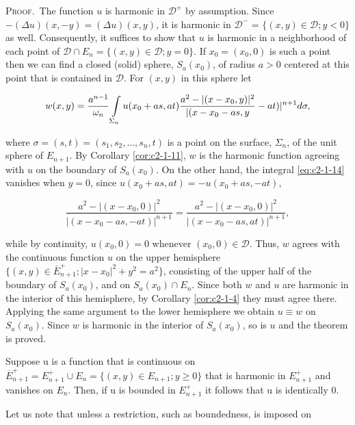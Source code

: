 \textsc{Proof.}\ The function $u$ is harmonic in $\mathcal{D}^+$ by assumption. Since $-(\Delta u)(x, -y) = (\Delta u)(x, y)$, it is harmonic in $\mathcal{D}^-$ = $\{(x, y) \in \mathcal{D}; y < 0\}$ as well. Consequently, it suffices to show that $u$ is harmonic in a neighborhood of each point of $\mathcal{D} \cap E_n = \{(x, y) \in \mathcal{D}; y = 0\}$. If $x_0 = (x_0, 0)$ is such a point then we can find a closed (solid) sphere, $S_a(x_0)$, of radius $a > 0$ centered at this point that is contained in $\mathcal{D}$. For $(x, y)$ in this sphere let

\begin{equation}\label{eq:c2-1-14}
w(x,y)=\frac{a^{n-1}}{\omega_{n}}\intop_{\Sigma_{n}}u(x_{0}+a s,a t)\frac{a^{2}-|(x-x_{0},y)|^{2}}{|(x-x_{0}-a s,y}-a t)|^{n+1}d\sigma,
\end{equation}

where $\sigma = (s, t) = (s_1, s_2, \ldots, s_n, t)$ is a point on the surface, $\Sigma_n$, of the unit sphere of $E_{n+1}$. By Corollary \ref{cor:c2-1-11}, $w$ is the harmonic function agreeing with $u$ on the boundary of $S_a(x_0)$. On the other hand, the integral \eqref{eq:c2-1-14} vanishes when $y = 0$, since $u(x_0 + as, at) = -u(x_0 + as, -at)$,

\[
\frac{a^{2}-|(x-x_{0},0)|^{2}}{|(x-x_{0}-as,-at)|^{n+1}}=\frac{a^{2}-|(x-x_{0},0)|^{2}}{|(x-x_{0}-as,at)|^{n+1}},
\]

while by continuity, $u(x_0,0)=0$ whenever $(x_0,0)\in\mathcal{D}$. Thus, $w$ agrees with the continuous function $u$ on the upper hemisphere $\{(x,y)\in\bar{E}_{n+1}^+ ; |x-x_0|^2+y^2=a^2\}$, consisting of the upper half of the boundary of $S_a(x_0)$, and on $S_a(x_0)\cap E_n$. Since both $w$ and $u$ are harmonic in the interior of this hemisphere, by Corollary \ref{cor:c2-1-4} they must agree there. Applying the same argument to the lower hemisphere we obtain $u\equiv w$ on $S_a(x_0)$. Since $w$ is harmonic in the interior of $S_a(x_0)$, so is $u$ and the theorem is proved.

\begin{corollary}
\label{cor:c2-1-15}
Suppose u is a function that is continuous on $\overline{E}_{n+1}^{+} = E_{n+1}^{+} \cup E_n = \{(x, y) \in E_{n+1}; y \geq 0\}$ that is harmonic in $E_{n+1}^{+}$ and vanishes on $E_n$. Then, if u is bounded in $E_{n+1}^{+}$ it follows that u is identically 0.
\end{corollary}

Let us note that unless a restriction, such as boundedness, is imposed on

